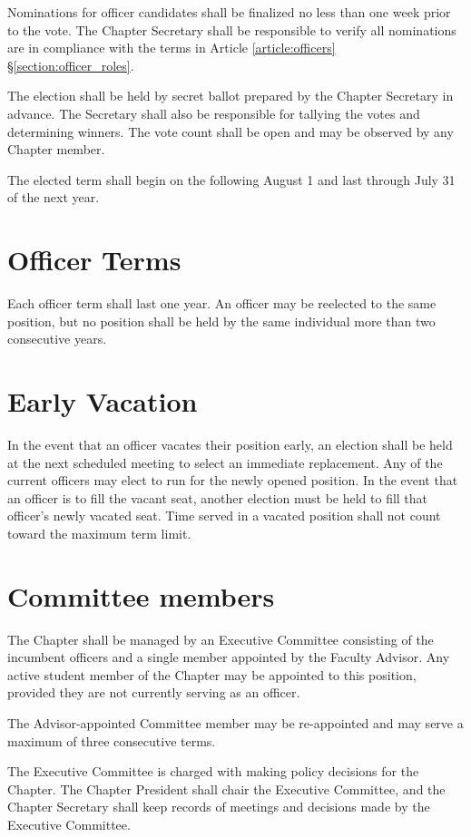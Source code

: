 \documentclass{ronr-bylaws}
\newcommand{\refsection}[2]{Article \ref{#1} \S \ref{#2}}
\begin{document}
Nominations for officer candidates shall be finalized no less than one week prior to the vote. The
Chapter Secretary shall be responsible to verify all nominations are in compliance with the terms in
\refsection{article:officers}{section:officer_roles}.

The election shall be held by secret ballot prepared by the Chapter Secretary in advance. The
Secretary shall also be responsible for tallying the votes and determining winners. The vote count
shall be open and may be observed by any Chapter member.

The elected term shall begin on the following August 1 and last through July 31 of the next year.

\section{Officer Terms}
Each officer term shall last one year. An officer may be reelected to the same position, but no
position shall be held by the same individual more than two consecutive years.

\section{Early Vacation}\label{section:early_vacation}
In the event that an officer vacates their position early, an election shall be held at the next
scheduled meeting to select an immediate replacement. Any of the current officers may elect to run
for the newly opened position. In the event that an officer is to fill the vacant seat, another
election must be held to fill that officer’s newly vacated seat. Time served in a vacated position
shall not count toward the maximum term limit.

\label{article:executive_committee}
\section{Committee members}
The Chapter shall be managed by an Executive Committee consisting of the incumbent officers and a
single member appointed by the Faculty Advisor. Any active student member of the Chapter may be
appointed to this position, provided they are not currently serving as an officer.

The Advisor-appointed Committee member may be re-appointed and may serve a maximum of three
consecutive terms.

The Executive Committee is charged with making policy decisions for the Chapter. The Chapter
President shall chair the Executive Committee, and the Chapter Secretary shall keep records of
meetings and decisions made by the Executive Committee.
\end{document}
